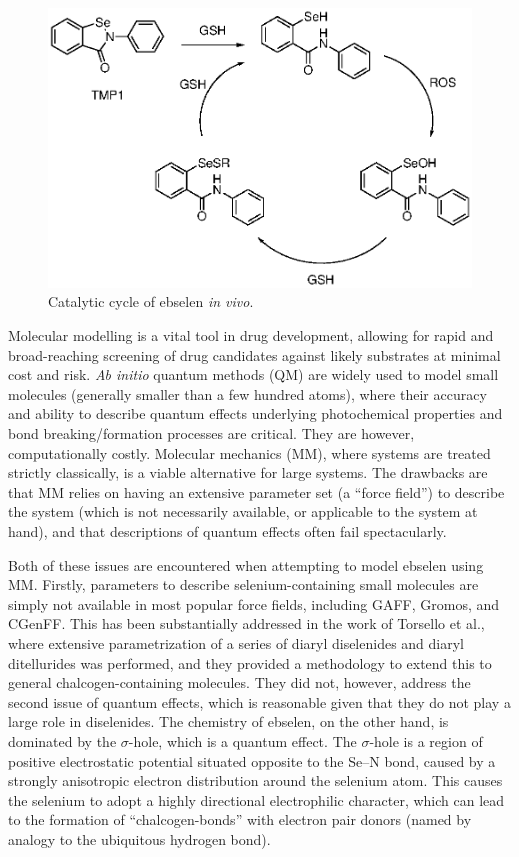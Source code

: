 \begin{refsection}
\begin{figure}
\centering
{}
\includegraphics[scale=0.74]{Figures/ebs-cat-cycle.eps}
\caption{Catalytic cycle of ebselen  \emph{in vivo}.}
\label{fig:catcycle}
\end{figure}

Molecular modelling is a vital tool in drug development, allowing for rapid and broad-reaching screening of drug candidates against likely substrates at minimal cost and risk.
\emph{Ab initio} quantum methods (QM) are widely used to model small molecules (generally smaller than a few hundred atoms), where their accuracy and ability to describe quantum effects underlying photochemical properties and bond breaking/formation processes are critical.
They are however, computationally costly.
Molecular mechanics (MM), where systems are treated strictly classically, is a viable alternative for large systems.
The drawbacks are that MM relies on having an extensive parameter set (a ``force field'') to describe the system (which is not necessarily available, or applicable to the system at hand), and that descriptions of quantum effects often fail spectacularly.

Both of these issues are encountered when attempting to model ebselen using MM.
Firstly, parameters to describe selenium-containing small molecules are simply not available in most popular force fields, including GAFF, Gromos, and CGenFF.
This has been substantially addressed in the work of Torsello et al., where extensive parametrization of a series of diaryl diselenides and diaryl ditellurides was performed, and they provided a methodology to extend this to general chalcogen-containing molecules.\autocite{Torsello2016}
They did not, however, address the second issue of quantum effects, which is reasonable given that they do not play a large role in diselenides.
The chemistry of ebselen, on the other hand, is dominated by the $\sigma$-hole, which is a quantum effect.\autocite{Thomas2015}
The $\sigma$-hole is a region of positive electrostatic potential situated opposite to the Se--N bond, caused by a strongly anisotropic electron distribution around the selenium atom.
This causes the selenium to adopt a highly directional electrophilic character, which can lead to the formation of ``chalcogen-bonds'' with electron pair donors (named by analogy to the ubiquitous hydrogen bond).\autocite{Murray2009}


\end{refsection}
